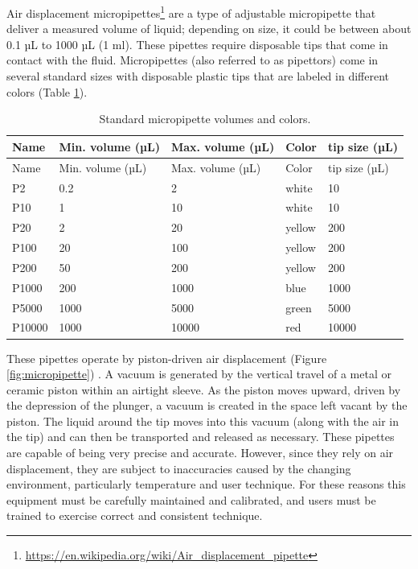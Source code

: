 \documentclass[]{book}
\let\rmarkdownfootnote\footnote%
\def\footnote{\protect\rmarkdownfootnote}
\renewcommand{\href}[2]{#2\footnote{\url{#1}}}
\theoremstyle{definition}
\theoremstyle{definition}
\theoremstyle{definition}
\theoremstyle{remark}
\begin{document}
\href{https://en.wikipedia.org/wiki/Air_displacement_pipette}{Air
displacement micropipettes} are a type of adjustable micropipette that
deliver a measured volume of liquid; depending on size, it could be
between about 0.1 µL to 1000 µL (1 ml). These pipettes require
disposable tips that come in contact with the fluid. Micropipettes (also
referred to as pipettors) come in several standard sizes with disposable
plastic tips that are labeled in different colors (Table
\ref{tab:standard}).

\begin{longtable}[]{@{}lllll@{}}
\caption{\label{tab:standard} Standard micropipette volumes and
colors.}\tabularnewline
\toprule
Name & Min. volume (µL) & Max. volume (µL) & Color & tip size
(µL)\tabularnewline
\midrule
\endfirsthead
\toprule
Name & Min. volume (µL) & Max. volume (µL) & Color & tip size
(µL)\tabularnewline
\midrule
\endhead
P2 & 0.2 & 2 & white & 10\tabularnewline
P10 & 1 & 10 & white & 10\tabularnewline
P20 & 2 & 20 & yellow & 200\tabularnewline
P100 & 20 & 100 & yellow & 200\tabularnewline
P200 & 50 & 200 & yellow & 200\tabularnewline
P1000 & 200 & 1000 & blue & 1000\tabularnewline
P5000 & 1000 & 5000 & green & 5000\tabularnewline
P10000 & 1000 & 10000 & red & 10000\tabularnewline
\bottomrule
\end{longtable}

These pipettes operate by piston-driven air displacement (Figure
\ref{fig:micropipette}) . A vacuum is generated by the vertical travel
of a metal or ceramic piston within an airtight sleeve. As the piston
moves upward, driven by the depression of the plunger, a vacuum is
created in the space left vacant by the piston. The liquid around the
tip moves into this vacuum (along with the air in the tip) and can then
be transported and released as necessary. These pipettes are capable of
being very precise and accurate. However, since they rely on air
displacement, they are subject to inaccuracies caused by the changing
environment, particularly temperature and user technique. For these
reasons this equipment must be carefully maintained and calibrated, and
users must be trained to exercise correct and consistent technique.
\end{document}
